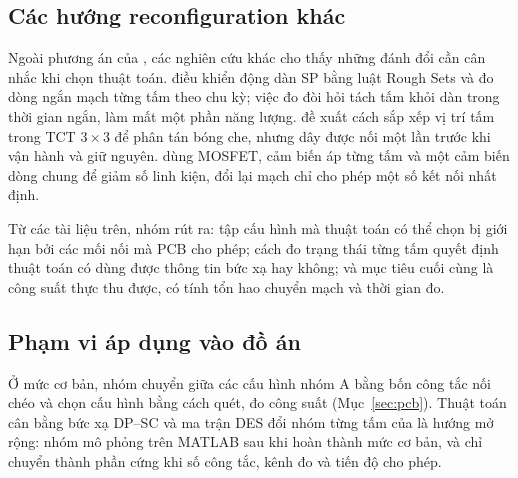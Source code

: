 \subsection{Các hướng reconfiguration khác}

Ngoài phương án của \cite{thanh}, các nghiên cứu khác cho thấy những đánh đổi cần cân nhắc khi chọn thuật toán. \cite{vicente} điều khiển động dàn SP bằng luật Rough Sets và đo dòng ngắn mạch từng tấm theo chu kỳ; việc đo đòi hỏi tách tấm khỏi dàn trong thời gian ngắn, làm mất một phần năng lượng. \cite{etarhouni} đề xuất cách sắp xếp vị trí tấm trong TCT \(3\times3\) để phân tán bóng che, nhưng dây được nối một lần trước khi vận hành và giữ nguyên. \cite{ngertugrul} dùng MOSFET, cảm biến áp từng tấm và một cảm biến dòng chung để giảm số linh kiện, đổi lại mạch chỉ cho phép một số kết nối nhất định.

Từ các tài liệu trên, nhóm rút ra: tập cấu hình mà thuật toán có thể chọn bị giới hạn bởi các mối nối mà PCB cho phép; cách đo trạng thái từng tấm quyết định thuật toán có dùng được thông tin bức xạ hay không; và mục tiêu cuối cùng là công suất thực thu được, có tính tổn hao chuyển mạch và thời gian đo.

\subsection{Phạm vi áp dụng vào đồ án}

Ở mức cơ bản, nhóm chuyển giữa các cấu hình nhóm A bằng bốn công tắc nối chéo và chọn cấu hình bằng cách quét, đo công suất (Mục~\ref{sec:pcb}). Thuật toán cân bằng bức xạ DP--SC và ma trận DES đổi nhóm từng tấm của \cite{thanh} là hướng mở rộng: nhóm mô phỏng trên MATLAB sau khi hoàn thành mức cơ bản, và chỉ chuyển thành phần cứng khi số công tắc, kênh đo và tiến độ cho phép.
